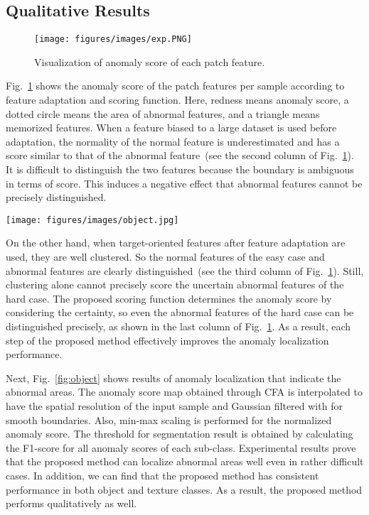 \documentclass[10pt,twocolumn,letterpaper]{article}
\begin{document}
    \subsection{Qualitative Results}
        \begin{figure}[t!]
\begin{center}
    \texttt{[image: figures/images/exp.PNG]}
\end{center}
\caption{Visualization of anomaly score of each patch feature.}
\label{fig:exp}\vspace{-0.15cm}
\end{figure}         Fig.~\ref{fig:exp} shows the anomaly score of the patch features per sample according to feature adaptation and scoring function. Here, redness means anomaly score, a dotted circle means the area of abnormal features, and a triangle means memorized features. When a feature biased to a large dataset is used before adaptation, the normality of the normal feature is underestimated and has a score similar to that of the abnormal feature~(see the second column of Fig.~\ref{fig:exp}). It is difficult to distinguish the two features because the boundary is ambiguous in terms of score. This induces a negative effect that abnormal features cannot be precisely distinguished.
        \begin{figure*}[t!]
    \begin{center}
        \texttt{[image: figures/images/object.jpg]}
    \end{center}
    \caption{Visualization of results of anomaly localization for object classes in MVTec AD benchmark.}
    \label{fig:object}\vspace{-0.15cm}
\end{figure*}         
        On the other hand, when target-oriented features after feature adaptation are used, they are well clustered. So the normal features of the easy case and abnormal features are clearly distinguished~(see the third column of Fig.~\ref{fig:exp}). Still, clustering alone cannot precisely score the uncertain abnormal features of the hard case. The proposed scoring function determines the anomaly score by considering the certainty, so even the abnormal features of the hard case can be distinguished precisely, as shown in the last column of Fig.~\ref{fig:exp}. As a result, each step of the proposed method effectively improves the anomaly localization performance.
        
        Next, Fig.~\ref{fig:object} shows results of anomaly localization that indicate the abnormal areas.
        The anomaly score map obtained through CFA is interpolated to have the spatial resolution of the input sample and Gaussian filtered with  for smooth boundaries.
        Also, min-max scaling is performed for the normalized anomaly score.
        The threshold for segmentation result is obtained by calculating the F1-score for all anomaly scores of each sub-class. Experimental results prove that the proposed method can localize abnormal areas well even in rather difficult cases. In addition, we can find that the proposed method has consistent performance in both object and texture classes. As a result, the proposed method performs qualitatively as well.
\end{document}
